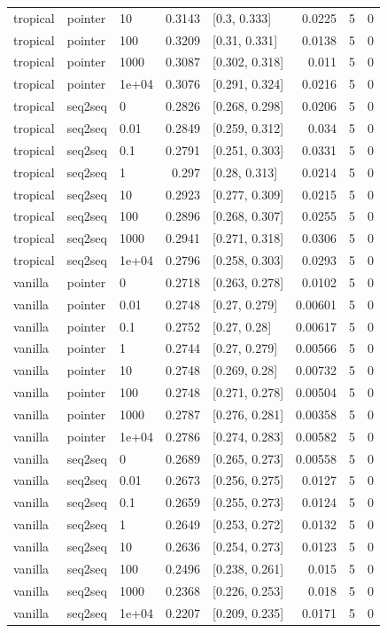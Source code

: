 \documentclass[10pt]{article}
\begin{document}
{\begin{longtable}{lllrlrrr}
tropical & pointer & 10 & 0.3143 & [0.3, 0.333] & 0.0225 & 5 & 0\\
tropical & pointer & 100 & 0.3209 & [0.31, 0.331] & 0.0138 & 5 & 0\\
tropical & pointer & 1000 & 0.3087 & [0.302, 0.318] & 0.011 & 5 & 0\\
tropical & pointer & 1e+04 & 0.3076 & [0.291, 0.324] & 0.0216 & 5 & 0\\
tropical & seq2seq & 0 & 0.2826 & [0.268, 0.298] & 0.0206 & 5 & 0\\
tropical & seq2seq & 0.01 & 0.2849 & [0.259, 0.312] & 0.034 & 5 & 0\\
tropical & seq2seq & 0.1 & 0.2791 & [0.251, 0.303] & 0.0331 & 5 & 0\\
tropical & seq2seq & 1 & 0.297 & [0.28, 0.313] & 0.0214 & 5 & 0\\
tropical & seq2seq & 10 & 0.2923 & [0.277, 0.309] & 0.0215 & 5 & 0\\
tropical & seq2seq & 100 & 0.2896 & [0.268, 0.307] & 0.0255 & 5 & 0\\
tropical & seq2seq & 1000 & 0.2941 & [0.271, 0.318] & 0.0306 & 5 & 0\\
tropical & seq2seq & 1e+04 & 0.2796 & [0.258, 0.303] & 0.0293 & 5 & 0\\
vanilla & pointer & 0 & 0.2718 & [0.263, 0.278] & 0.0102 & 5 & 0\\
vanilla & pointer & 0.01 & 0.2748 & [0.27, 0.279] & 0.00601 & 5 & 0\\
vanilla & pointer & 0.1 & 0.2752 & [0.27, 0.28] & 0.00617 & 5 & 0\\
vanilla & pointer & 1 & 0.2744 & [0.27, 0.279] & 0.00566 & 5 & 0\\
vanilla & pointer & 10 & 0.2748 & [0.269, 0.28] & 0.00732 & 5 & 0\\
vanilla & pointer & 100 & 0.2748 & [0.271, 0.278] & 0.00504 & 5 & 0\\
vanilla & pointer & 1000 & 0.2787 & [0.276, 0.281] & 0.00358 & 5 & 0\\
vanilla & pointer & 1e+04 & 0.2786 & [0.274, 0.283] & 0.00582 & 5 & 0\\
vanilla & seq2seq & 0 & 0.2689 & [0.265, 0.273] & 0.00558 & 5 & 0\\
vanilla & seq2seq & 0.01 & 0.2673 & [0.256, 0.275] & 0.0127 & 5 & 0\\
vanilla & seq2seq & 0.1 & 0.2659 & [0.255, 0.273] & 0.0124 & 5 & 0\\
vanilla & seq2seq & 1 & 0.2649 & [0.253, 0.272] & 0.0132 & 5 & 0\\
vanilla & seq2seq & 10 & 0.2636 & [0.254, 0.273] & 0.0123 & 5 & 0\\
vanilla & seq2seq & 100 & 0.2496 & [0.238, 0.261] & 0.015 & 5 & 0\\
vanilla & seq2seq & 1000 & 0.2368 & [0.226, 0.253] & 0.018 & 5 & 0\\
vanilla & seq2seq & 1e+04 & 0.2207 & [0.209, 0.235] & 0.0171 & 5 & 0\\
\bottomrule
\end{longtable}
}
\end{document}
